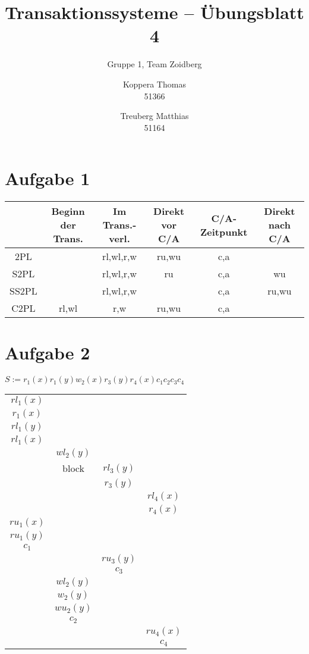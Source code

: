 \documentclass{scrartcl}
\title{Transaktionssysteme -- Übungsblatt 4}
\subtitle{Gruppe 1, Team Zoidberg}
\author{Koppera Thomas \\ 51366
 \and Treuberg Matthias \\ 51164}
\date{ }
\begin{document}
  \maketitle
  
\section*{Aufgabe 1}

\begin{tabular}[ht]{|c|c|c|c|c|c|}
\hline  & Beginn der Trans. & Im Trans.-verl. & Direkt vor C/A & C/A- Zeitpunkt & Direkt nach C/A \\ 
\hline 2PL & & rl,wl,r,w & ru,wu & c,a &  \\ 
\hline S2PL &  & rl,wl,r,w & ru & c,a & wu \\ 
\hline SS2PL &  & rl,wl,r,w & & c,a & ru,wu \\ 
\hline C2PL & rl,wl & r,w & ru,wu & c,a &  \\ 
\hline 
\end{tabular} 


\section*{Aufgabe 2}
$S := r_1(x)r_1(y)w_2(x)r_3(y)r_4(x)c_1c_2c_3c_4$\\
\begin{tabular}{|c|c|c|c|}
\hline
 $rl_1(x)$ &  &  &  \\ 
 $r_1(x)$ &  &  &  \\ 
 $rl_1(y)$ &  &  &  \\ 
 $rl_1(x)$ &  &  &  \\ 
  & $wl_2(y)$ &  &  \\ 
  & block & $rl_3(y)$ &  \\ 
  &  & $r_3(y)$ &  \\ 
  &  &  & $rl_4(x)$ \\ 
  &  &  & $r_4(x)$ \\ 
 $ru_1(x)$ &  &  &  \\ 
 $ru_1(y)$ &  &  &  \\ 
 $c_1$ &  &  &  \\ 
  &  & $ru_3(y)$ &  \\ 
  &  & $c_3$ &  \\ 
  & $wl_2(y)$ &  &  \\ 
  & $w_2(y)$ &  &  \\ 
  & $wu_2(y)$ &  &  \\ 
  & $c_2$ &  &  \\ 
  &  &  & $ru_4(x)$ \\ 
  &  &  & $c_4$ \\ 
\hline
\end{tabular}
\end{document}
